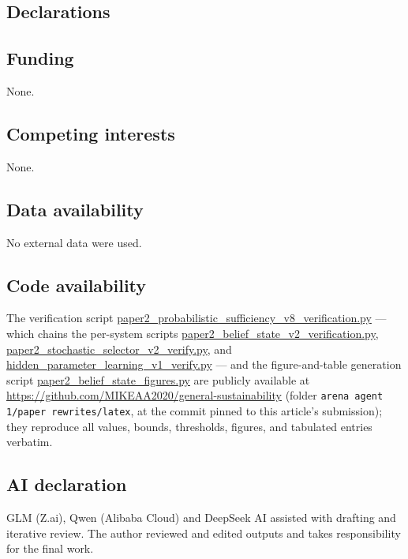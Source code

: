 \documentclass[10pt,twocolumn]{article}
\theoremstyle{plain}
\theoremstyle{definition}
\theoremstyle{remark}
\begin{document}
\subsection*{Declarations}

\subsection*{Funding}
None.

\subsection*{Competing interests}
None.

\subsection*{Data availability}
No external data were used.

\subsection*{Code availability}
The verification script
\url{paper2_probabilistic_sufficiency_v8_verification.py} --- which chains
the per-system scripts \url{paper2_belief_state_v2_verification.py},
\url{paper2_stochastic_selector_v2_verify.py}, and
\url{hidden_parameter_learning_v1_verify.py} --- and the figure-and-table
generation script \url{paper2_belief_state_figures.py} are publicly
available at \url{https://github.com/MIKEAA2020/general-sustainability}
(folder \texttt{arena agent 1/paper rewrites/latex}, at the commit
pinned to this article's submission); they reproduce all values, bounds,
thresholds, figures, and tabulated entries verbatim.

\subsection*{AI declaration}
GLM (Z.ai), Qwen (Alibaba Cloud) and DeepSeek AI assisted with drafting
and iterative review. The author reviewed and edited outputs and takes
responsibility for the final work.
\end{document}
